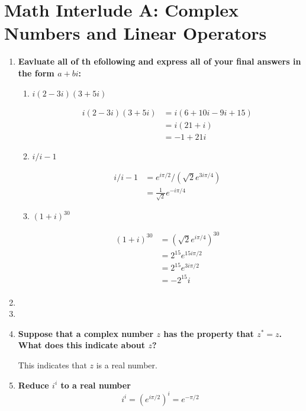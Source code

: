\documentclass[9pt]{report}
\begin{document}
  \chapter{Math Interlude A: Complex Numbers and Linear Operators}
  \begin{enumerate}
    \item \textbf{Eavluate all of th efollowing and express all of your final
      answers in the form $a + bi$:}
        \begin{enumerate}
          \item $i (2-3i)(3 + 5i)$

            \[
              \begin{align}
                i (2-3i)(3 + 5i) &= i (6 + 10i - 9i + 15) \\
                                 &= i (21 + i)\\
                                 &= -1 + 21i
              \end{align}
            \]

      \item $ i/i-1 $

      \[
        \begin{align}
            i/i-1 &= e^{i\pi/2} / (\sqrt{2} e^{3i\pi/4})\\
                  &= \frac{1}{\sqrt{2}} e^{-i\pi/4}
        \end{align}
      \]

    \item $(1 + i)^{30}$

      \[
      \begin{align}
        (1 + i)^{30} &= (\sqrt{2} e^{i\pi/4})^{30}\\
                     &= 2^{15} e^{15i\pi/2}\\
                     &= 2^{15} e^{3i\pi/2} \\
                     &= -2^{15} i\\
      \end{align}
    \]
        \end{enumerate}
      \item
      \item 
      \item \textbf{Suppose that a complex number $z$ has the property that $z^* = z$. What does this indicate about $z$?}

        This indicates that $z$ is a real number.

      \item \textbf{Reduce $i^i$ to a real number}
        \[
          i^i = (e^{i\pi/2})^i = e^{-\pi/2}

\]
\end{enumerate}
\end{document}
